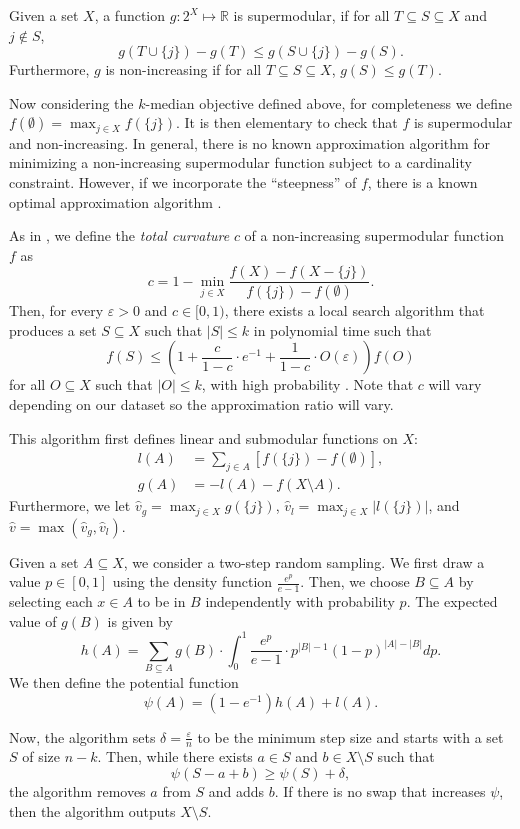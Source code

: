 \documentclass{article}
\begin{document}
Given a set $X$, a function $g:2^{X} \mapsto \mathbb{R}$ is supermodular, if for all $T \subseteq S \subseteq X$ and $j \notin S$, 
\[ g(T \cup \{j\}) - g(T) \leq g(S \cup \{j\}) - g(S). \]
Furthermore, $g$ is non-increasing if for all $T \subseteq S \subseteq X$, $g(S) \leq g(T)$. 

Now considering the $k$-median objective defined above, for completeness we define $f(\emptyset) = \max_{j \in X} f(\{j\})$. It is then elementary to check that $f$ is supermodular and non-increasing. In general, there is no known approximation algorithm for minimizing a non-increasing supermodular function subject to a cardinality constraint. However, if we incorporate the ``steepness'' of $f$, there is a known optimal approximation algorithm \cite{Sviridenko}.

As in \cite{Sviridenko}, we define the \emph{total curvature} $c$ of a non-increasing supermodular function $f$ as 
\[ c = 1 - \min_{j \in X}  \frac{ f(X) - f(X- \{j\})}{ f(\{j\}) - f(\emptyset)}.\]
Then, for every $\varepsilon >0$ and $c \in [0,1)$, there exists a local search algorithm that produces a set $S \subseteq X$ such that $|S| \leq k$ in polynomial time such that 
\[ f(S) \leq \left( 1 + \frac{c}{1-c} \cdot e^{-1} + \frac{1}{1-c} \cdot O(\varepsilon) \right) f(O) \]
for all $O \subseteq X$ such that $|O| \leq k$, with high probability \cite{Sviridenko}. Note that $c$ will vary depending on our dataset so the approximation ratio will vary. 

This algorithm first defines linear and submodular functions on $X$:
\begin{align*}
l(A) &= \sum_{j \in A} \left [ f(\{j\}) - f(\emptyset) \right], \\
g(A) & = - l(A) - f(X \setminus A).
\end{align*}
Furthermore, we let $\hat{v}_g = \max_{j \in X} g(\{j\})$, $\hat{v}_l = \max_{j \in X} |l(\{j\})|$, and $\hat{v} = \max(\hat{v}_g , \hat{v}_l)$. 

Given a set $A \subseteq X$, we consider a two-step random sampling. We first draw a value $p \in [0,1]$ using the density function $\frac{{e}^p}{e-1}$. Then, we choose $B \subseteq A$ by selecting each $x \in A$ to be in $B$ independently with probability $p$. The expected value of $g(B)$ is given by
\[  h(A) = \sum_{B \subseteq A} g(B) \cdot \int_{0}^1 \frac{e^p}{e-1} \cdot p^{|B|-1} (1-p)^{|A|-|B|} dp. \]
We then define the potential function
\[ \psi(A) = (1-e^{-1}) h(A) + l(A). \]

Now, the algorithm sets $\delta = \frac{\varepsilon}{n}$ to be the minimum step size and starts with a set $S$ of size $n-k$. Then, while there exists $a \in S$ and $b \in X \setminus S$ such that 
\[ \psi(S -a +b) \geq \psi(S) + \delta, \]
the algorithm removes $a$ from $S$ and adds $b$. If there is no swap that increases $\psi$, then the algorithm outputs $X \setminus S$. 
\end{document}
